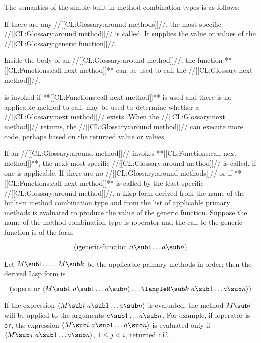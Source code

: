 The semantics of the simple built-in method combination types is as
follows:

\beginlist
\itemitem{\bull}                                                    
If there are any //[[CL:Glossary:around methods]]//, the most specific //[[CL:Glossary:around method]]//
is called.   It supplies the value or values of the //[[CL:Glossary:generic function]]//. 
                                    
\itemitem{\bull} Inside the body of an //[[CL:Glossary:around method]]//, the function
**[[CL:Functions:call-next-method]]** can be used to call the //[[CL:Glossary:next method]]//.



 is invoked if 
**[[CL:Functions:call-next-method]]** is used and there is no applicable method to call.
 may be used to determine whether a
//[[CL:Glossary:next method]]// exists. When the //[[CL:Glossary:next method]]// returns, 
the //[[CL:Glossary:around method]]// can execute more code,
perhaps based on the returned value or values.
                    
\itemitem{\bull} If an //[[CL:Glossary:around method]]// invokes **[[CL:Functions:call-next-method]]**,
the next most specific //[[CL:Glossary:around method]]// is
called, if one is applicable.  If there are no //[[CL:Glossary:around methods]]//
or if **[[CL:Functions:call-next-method]]** is called by the least specific
//[[CL:Glossary:around method]]//, a Lisp form derived from the name of the built-in
method combination type and from the list of applicable primary
methods is evaluated to produce the value of the generic function.
Suppose the name of the method combination type is \i{operator}
and the call to the generic function is of the form

$$(\hbox{\i{generic-function}}\ a\sub 1\ldots a\sub n)$$

\itemitem{} Let $M\sub 1,\ldots,M\sub k$ be the applicable primary methods
in order; then the derived Lisp form is

$$(\hbox{\i{operator}}\ \langle M\sub  1%
\ a\sub 1\ldots a\sub n\rangle\ldots\langle%
M\sub k\ a\sub 1\ldots a\sub n\rangle)$$

\itemitem{} If the expression $\langle M\sub i \ a\sub 1\ldots a\sub
n\rangle$ is
evaluated, the method $M\sub i$ will be applied to the arguments
$a\sub 1\ldots a\sub n$.  
For example,
if \i{operator} is {\tt or},
the expression $\langle M\sub i \ a\sub 1\ldots a\sub n\rangle$ is
evaluated only if $\langle M\sub j \ a\sub 1\ldots a\sub n\rangle$,
$1\leq j<i$, returned {\tt nil}.
                                                      
